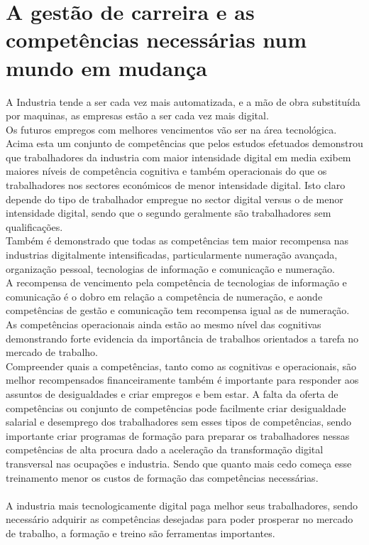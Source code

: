 \section{A gestão de carreira e as competências necessárias num mundo em mudança}
\qquad A Industria tende a ser cada vez mais automatizada, e a mão de obra substituída por maquinas, as empresas estão a ser cada vez mais digital.\\
Os futuros empregos com melhores vencimentos vão ser na área tecnológica.\\

Acima esta um conjunto de competências que pelos estudos efetuados demonstrou que trabalhadores da industria com maior intensidade digital em media exibem maiores níveis de competência cognitiva e também operacionais do que os trabalhadores nos sectores económicos de menor intensidade digital. Isto claro depende do tipo de trabalhador empregue no sector digital versus o de menor intensidade digital, sendo que o segundo geralmente são trabalhadores sem qualificações.\cite{article_1}\\
Também é demonstrado que todas as competências tem maior recompensa nas industrias digitalmente intensificadas, particularmente numeração avançada, organização pessoal, tecnologias de informação e comunicação e numeração.\cite{article_1}\\
A recompensa de vencimento pela competência de tecnologias de informação e comunicação é o dobro em relação a competência de numeração, e aonde competências de gestão e comunicação tem recompensa igual as de numeração.\cite{article_1}\\
As competências operacionais ainda estão ao mesmo nível das cognitivas demonstrando forte evidencia da importância de trabalhos orientados a tarefa no mercado de trabalho.\cite{article_1}\\
Compreender quais a competências, tanto como as cognitivas e operacionais, são melhor recompensados financeiramente também é importante para responder aos assuntos de  desigualdades e criar empregos e bem estar. A falta da oferta de competências ou conjunto de competências pode facilmente criar desigualdade salarial e desemprego dos trabalhadores sem esses tipos de competências, sendo importante criar programas de formação para preparar os trabalhadores nessas competências de alta procura dado a aceleração da transformação digital transversal nas ocupações e industria. Sendo que quanto mais cedo começa esse treinamento menor os custos de formação das competências necessárias.\cite{article_1}\\
\\
A industria mais tecnologicamente digital paga melhor seus trabalhadores, sendo necessário adquirir as competências desejadas para poder prosperar no mercado de trabalho, a formação e treino são ferramentas importantes.
